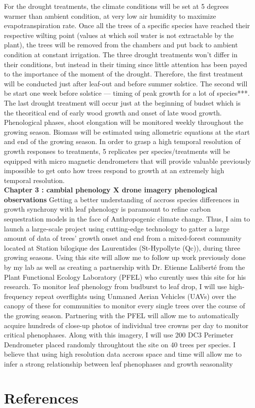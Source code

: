 \documentclass[12pt]{article}
\begin{document}
For the drought treatments, the climate conditions will be set at 5 degrees warmer than ambient condition, at very low air humidity to maximize evapotranspiration rate. Once all the trees of a specific species have reached their respective wilting point (values at which soil water is not extractable by the plant), the trees will be removed from the chambers and put back to ambient condition at constant irrigation. The three drought treatments won't differ in their conditions, but instead in their timing since little attention has been payed to the importance of the moment of the drought. Therefore, the first treatment will be conducted just after leaf-out and before summer solstice. The second will be start one week before solstice --- timing of peak growth for a lot of species***. The last drought treatment will occur just at the beginning of budset which is the theoritical end of early wood growth and onset of late wood growth. Phenological phases, shoot elongation will be monitored weekly throughout the growing season. Biomass will be estimated using allometric equations at the start and end of the growing season. In order to grasp a high temporal resolution of growth responses to treatments, 5 replicates per species/treatments will be equipped with micro magnetic dendrometers that will provide valuable previously impossible to get onto how trees respond to growth at an extremely high temporal resolution. \\


\textbf{Chapter 3 : cambial phenology X drone imagery phenological observations}
Getting a better understanding of accross species differences in growth synchrony with leaf phenology is paramount to refine carbon sequestration models in the face of Anthropogenic climate change. Thus, I aim to launch a large-scale project using cutting-edge technology to gatter a large amount of data of trees' growth onset and end from a mixed-forest community located at Station bilogique des Laurentides (St-Hypollyte (Qc)), during three growing seasons. Using this site will allow me to follow up work previously done by my lab as well as creating a partnership with Dr. Etienne Laliberté from the Plant Functional Ecology Laboratory (PFEL) who curently uses this site for his research. To monitor leaf phenology from budburst to leaf drop, I will use high-frequency repeat overflights using Unmaned Aerian Vehicles (UAVs) over the canopy of these for communities to monitor every single trees over the course of the growing season. Partnering with the PFEL will allow me to automatically acquire hundreds of close-up photos of individual tree crowns per day to monitor critical phenophases. Along with this imagery, I will use 200 DC3 Perimeter Dendrometer placed randomly throughtout the site on 40 trees per species. I believe that using high resolution data accross space and time will allow me to infer a strong relationship between leaf phenophases and growth seasonality

\section{References}

\end{document}
